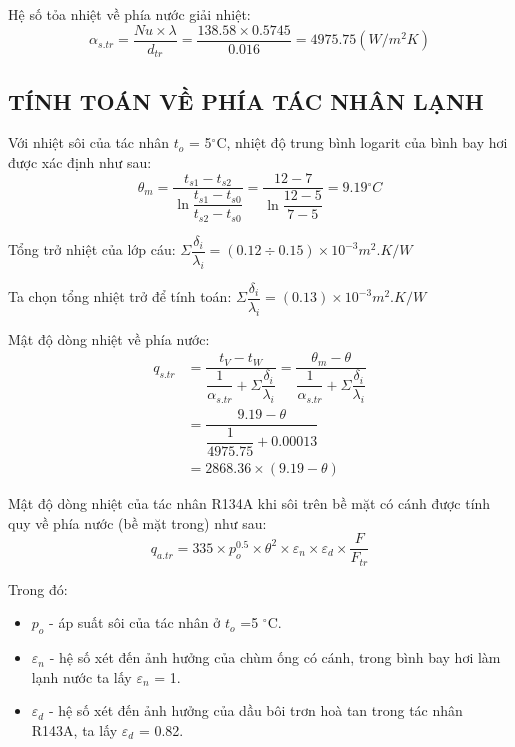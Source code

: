 Hệ số tỏa nhiệt về phía nước giải nhiệt:
\begin{equation*}
	\alpha_{s.tr} = \dfrac{Nu\times\lambda}{d_{tr}} =\dfrac{138.58 \times 0.5745}{0.016}=4975.75(W/m^2K)
\end{equation*}

\subsection{TÍNH TOÁN VỀ PHÍA TÁC NHÂN LẠNH}
Với nhiệt sôi của tác nhân $t_{o}$ = 5$^{\circ}$C, nhiệt độ trung bình logarit của bình bay hơi được xác định như sau:
\begin{equation*}
	\theta_{m} = \dfrac{t_{s1} - t_{s2}}{\ln{\dfrac{t_{s1} - t_{s0}}{t_{s2} - t_{s0}}}} = \dfrac{12-7}{\ln{\dfrac{12-5}{7-5}}}=9.19{^\circ}C
\end{equation*}

Tổng trở nhiệt của lớp cáu:
$\Sigma \dfrac{\delta_{i}}{\lambda_{i}} = (0.12 \div 0.15)\times 10^{-3} m^2.K/W$

Ta chọn tổng nhiệt trở để tính toán: $\Sigma \dfrac{\delta_{i}}{\lambda_{i}} = (0.13)\times 10^{-3} m^2.K/W$

Mật độ dòng nhiệt về phía nước:
\begin{equation*}
	\begin{split}
		q_{s.tr} &= \dfrac{t_{V} - t_{W}}{\dfrac{1}{\alpha_{s.tr}} + \Sigma \dfrac{\delta_{i}}{\lambda_{i}}} = \dfrac{\theta_{m} - \theta}{\dfrac{1}{\alpha_{s.tr}} + \Sigma \dfrac{\delta_{i}}{\lambda_{i}}}\\
		&= \dfrac{9.19 - \theta}{\dfrac{1}{4975.75}+0.00013}\\
		&= 2868.36 \times (9.19 - \theta)
	\end{split}
\end{equation*}

Mật độ dòng nhiệt của tác nhân R134A khi sôi trên bề mặt có cánh được tính quy về phía nước (bề mặt trong) như sau:
\begin{equation*}
	q_{a.tr} = 335\times p_{o}^{0.5}\times\theta^2\times\varepsilon_{n}\times\varepsilon_{d}\times\dfrac{F}{F_{tr}}
\end{equation*}

Trong đó:
\begin{itemize}
	\item $p_{o}$ - áp suất sôi của tác nhân ở $t_{o}$ =5 $^{\circ}$C.
	\item $\varepsilon_{n}$ - hệ số xét đến ảnh hưởng của chùm ống có cánh, trong bình bay hơi làm lạnh nước ta lấy $\varepsilon_{n}$ = 1.
	\item $\varepsilon_{d}$ - hệ số xét đến ảnh hưởng của dầu bôi trơn hoà tan trong tác nhân R143A, ta lấy $\varepsilon_{d}$ = 0.82.
\end{itemize}


